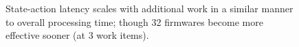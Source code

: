 \documentclass[
sigconf,natbib=false
]{acmart}
\begin{document}
\begin{figure}
	\caption{State-action latency scales with additional work in a similar manner to overall processing time; though \SI{32}{\bit} firmwares become more effective sooner (at \num{3} work items).\label{fig:vary-work-latency}}
\end{figure}
\end{document}

